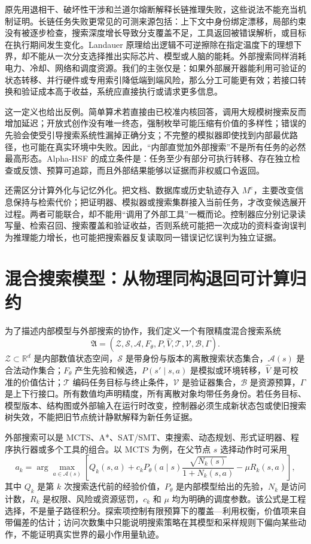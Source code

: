 原先用退相干、破坏性干涉和兰道尔熔断解释长链推理失败，这些说法不能充当机制证明。长链任务失败更常见的可测来源包括：上下文中身份绑定漂移，局部约束没有被逐步检查，搜索深度增长导致分支覆盖不足，工具返回被错误解析，或目标在执行期间发生变化。Landauer 原理给出逻辑不可逆擦除在指定温度下的理想下界，却不能从一次分支选择推出实际芯片、模型或人脑的能耗。外部搜索同样消耗电力、冷却、网络和调度资源。我们的主张仅是：如果外部展开器能利用可验证的状态转移、并行硬件或专用索引降低端到端风险，那么分工可能更有效；若接口转换和验证成本高于收益，系统应直接执行或请求更多信息。

这一定义也给出反例。简单算术若直接由已校准内核回答，调用大规模树搜索反而增加延迟；开放式创作没有唯一终态，强制枚举可能压缩有价值的多样性；错误的先验会使受引导搜索系统性漏掉正确分支；不完整的模拟器即使找到内部最优路径，也可能在真实环境中失败。因此，“内部直觉加外部搜索”不是所有任务的必然最高形态。Alpha-HSF 的成立条件是：任务至少有部分可执行转移、存在独立检查或反馈、预算可追踪，而且外部结果能够以证据而非权威口令返回。

还需区分计算外化与记忆外化。把文档、数据库或历史轨迹存入 $M^e$，主要改变信息保持与检索代价；把证明器、模拟器或搜索集群接入当前任务，才改变候选展开过程。两者可能联合，却不能用“调用了外部工具”一概而论。控制器应分别记录读写量、检索召回、搜索覆盖和验证收益，否则系统可能把一次成功的资料查询误判为推理能力增长，也可能把搜索器反复读取同一错误记忆误判为独立证据。

\section{混合搜索模型：从物理同构退回可计算归约}
\label{sec:alpha_hsf_mathematical_proofs}

为了描述内部模型与外部搜索的协作，我们定义一个有限精度混合搜索系统
\[
\mathfrak{A}=(\mathcal{Z},\mathcal{S},\mathcal{A},F_{\theta},P,\widehat V,\mathcal{T},\mathcal{V},\mathcal{B},\Gamma).
\]
$\mathcal{Z}\subset\mathbb{R}^{d}$ 是内部数值状态空间，$\mathcal{S}$ 是带身份与版本的离散搜索状态集合，$\mathcal{A}(s)$ 是合法动作集合；$F_{\theta}$ 产生先验和候选，$P(s'\mid s,a)$ 是模拟或环境转移，$\widehat V$ 是可校准的价值估计；$\mathcal{T}$ 编码任务目标与终止条件，$\mathcal{V}$ 是验证器集合，$\mathcal{B}$ 是资源预算，$\Gamma$ 是上下行接口。所有数值均声明精度，所有离散对象均带任务身份。若任务目标、模型版本、结构图或外部输入在运行时改变，控制器必须生成新状态包或使旧搜索树失效，不能把旧节点统计静默解释为新任务证据。

外部搜索可以是 MCTS、A*、SAT/SMT、束搜索、动态规划、形式证明器、程序执行器或多个工具的组合。以 MCTS 为例，在父节点 $s$ 选择动作时可采用
\[
a_k=\arg\max_{a\in\mathcal{A}(s)}\left[
Q_k(s,a)+c_kP_{\theta}(a\mid s)\frac{\sqrt{N_k(s)}}{1+N_k(s,a)}
-\mu R_k(s,a)\right],
\]
其中 $Q_k$ 是第 $k$ 次搜索迭代前的经验价值，$P_{\theta}$ 是内部模型给出的先验，$N_k$ 是访问计数，$R_k$ 是权限、风险或资源惩罚，$c_k$ 和 $\mu$ 均为明确的调度参数。该公式是工程选择，不是量子路径积分。探索项控制有限预算下的覆盖—利用权衡，价值项来自带偏差的估计；访问次数集中只能说明搜索策略在其模型和采样规则下偏向某些动作，不能证明真实世界的最小作用量轨迹。

